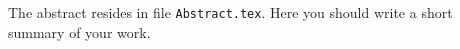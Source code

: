 
The abstract resides in file \texttt{Abstract.tex}. Here you should write a short summary of your work.



